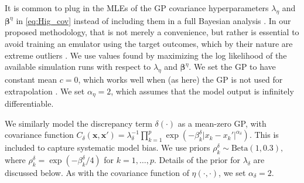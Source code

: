 \documentclass[12pt]{article}
\begin{document}
%
It is common to plug in the MLEs of the GP covariance hyperparameters $\lambda_\eta$ and $\boldsymbol \beta^\eta$ in \eqref{eq:Hig_cov} instead of including them in a full Bayesian analysis \citep{Kennedy2001,Santner2003a,Qian2008,Paulo2012}.
%
In our proposed methodology, that is not merely a convenience, but rather is essential 
%
%
%
%
to avoid training an emulator using the target outcomes, which by their nature are extreme outliers  \citep[see][on the dangers that arise here]{Liu2009}.
%
We use values found by maximizing the log likelihood of the available simulation runs with respect to $\lambda_\eta$ and $\boldsymbol\beta^\eta$.
%
We set the GP to have constant mean $c=0$, which works well when (as here) the GP is not used for extrapolation \citep{Bayarri2007}.
%
We set $\alpha_\eta = 2$, which assumes that the model output is infinitely differentiable.
%

%
We similarly model the discrepancy term $\delta(\cdot)$ as a mean-zero GP, with covariance function
%
$C_\delta(\mathbf x,\mathbf x') = \lambda_\delta^{-1} \prod_{k=1}^p
\exp\left( -\beta_k^\delta |x_k-x_k'|^{\alpha_\delta} \right).$
%
This is included to capture systematic model bias.
%
We use priors
$\rho^\delta_k \sim \mathrm{Beta}(1,0.3),$
where $\rho_k^\delta = \exp(-\beta_k^\delta/4)$ for $k=1,\ldots,p$. 
%
%
%
Details of the prior for $\lambda_\delta$ are discussed below.
%
As with the covariance function of $\eta(\cdot,\cdot)$, we set $\alpha_\delta=2$.
%
\end{document}
